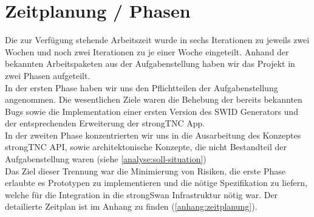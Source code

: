 \section{Zeitplanung / Phasen}
Die zur Verfügung stehende Arbeitszeit wurde in sechs Iterationen zu jeweils
zwei Wochen und noch zwei Iterationen zu je einer Woche eingeteilt. Anhand der
bekannten Arbeitspaketen aus der Aufgabenstellung haben wir das Projekt in zwei
Phasen aufgeteilt.\\
In der ersten Phase haben wir uns den Pflichtteilen der Aufgabenstellung
angenommen. Die wesentlichen Ziele waren die Behebung der bereits bekannten Bugs
sowie die Implementation einer ersten Version des SWID Generators und der
entsprechenden Erweiterung der strongTNC App. \\
In der zweiten Phase konzentrierten wir uns in die Ausarbeitung des Konzeptes
strongTNC API, sowie architektonische Konzepte, die nicht Bestandteil der
Aufgabenstellung waren (siehe \autoref{analyse:soll-situation})\\
Das Ziel dieser Trennung war die Minimierung von Risiken, die erste Phase
erlaubte es Prototypen zu implementieren und die nötige Spezifikation zu
liefern, welche für die Integration in die strongSwan Infrastruktur nötig war.
Der detailierte Zeitplan ist im Anhang zu finden (\autoref{anhang:zeitplanung}).
